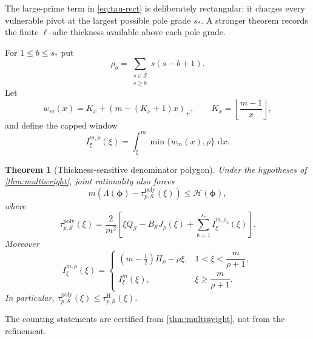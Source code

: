 \documentclass[11pt]{article}
\newtheorem{theorem}{Theorem}[section]
\theoremstyle{definition}
\theoremstyle{remark}
\newcommand{\dd}{\,\mathrm d}
\newcommand{\Energy}{\mathscr H}
\newcommand{\LambdaAH}{\Lambda}
\newcommand{\floor}[1]{\left\lfloor #1\right\rfloor}
\newcommand{\positivepart}[1]{\left(#1\right)_+}
\begin{document}
The large-prime term in \eqref{eq:tau-rect} is deliberately rectangular: it
charges every vulnerable pivot at the largest possible pole grade $s_*$.  A
stronger theorem records the finite $\ell$-adic thickness available above
each pole grade.

For $1\le b\le s_*$ put
\begin{equation}\label{eq:rho-b}
 \rho_b=\sum_{\substack{s\in\mathcal S\\s\ge b}}s(s-b+1).
\end{equation}
Let
\[
 w_m(x)=K_x+\positivepart{m-(K_x+1)x},
 \qquad
 K_x=\floor{\frac{m-1}{x}},
\]
and define the capped window
\begin{equation}\label{eq:I-cap-def}
 I^{m,\rho}_\xi(\xi)=\int_\xi^m\min\{w_m(x),\rho\}\,\dd x.
\end{equation}

\begin{theorem}[Thickness-sensitive denominator polygon]
\label{thm:polygon}
Under the hypotheses of \cref{thm:multiweight}, joint rationality also forces
\begin{equation}\label{eq:poly-holonomy}
 m\left(\LambdaAH(\boldsymbol\phi)
 -\tau^{\mathrm{poly}}_{p,\mathcal S}(\xi)\right)
 \le\Energy(\boldsymbol\phi),
\end{equation}
where
\begin{equation}\label{eq:tau-poly}
 \boxed{
 \tau^{\mathrm{poly}}_{p,\mathcal S}(\xi)
 =\frac{2}{m^2}\left[
 \xi Q_{\mathcal S}-B_{\mathcal S}J_p(\xi)
 +\sum_{b=1}^{s_*}I^{m,\rho_b}_\xi(\xi)
 \right].}
\end{equation}
Moreover
\begin{equation}\label{eq:I-cap-explicit}
 I^{m,\rho}_\xi(\xi)=
 \begin{cases}
 \displaystyle
 \left(m-\frac12\right)H_\rho-\rho\xi,
 &1<\xi<\dfrac{m}{\rho+1},\\[3mm]
 I^m_\xi(\xi),&\xi\ge\dfrac{m}{\rho+1}.
 \end{cases}
\end{equation}
In particular, $\tau^{\mathrm{poly}}_{p,\mathcal S}(\xi)
\le\tau^{\mathrm H}_{p,\mathcal S}(\xi)$.
\end{theorem}

The counting statements are certified from \cref{thm:multiweight}, not from
the refinement.
\end{document}
